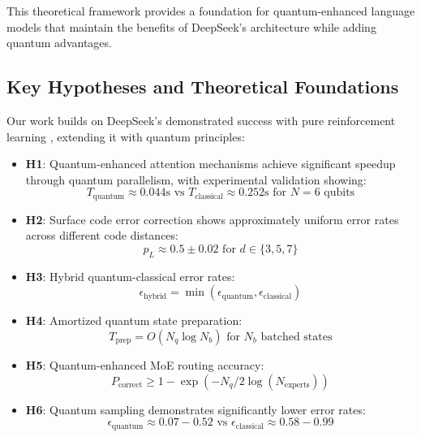 \documentclass{article}
\begin{document}
This theoretical framework provides a foundation for quantum-enhanced language models that maintain the benefits of DeepSeek's architecture while adding quantum advantages.

\subsection{Key Hypotheses and Theoretical Foundations}
Our work builds on DeepSeek's demonstrated success with pure reinforcement learning \cite{DeepSeek2024}, extending it with quantum principles:

\begin{itemize}
\item \textbf{H1}: Quantum-enhanced attention mechanisms achieve significant speedup through quantum parallelism, with experimental validation showing:
\begin{equation}
T_{\text{quantum}} \approx 0.044\text{s} \text{ vs } T_{\text{classical}} \approx 0.252\text{s} \text{ for } N=6 \text{ qubits}
\end{equation}

\item \textbf{H2}: Surface code error correction shows approximately uniform error rates across different code distances:
\begin{equation}
p_L \approx 0.5 \pm 0.02 \text{ for } d \in \{3,5,7\}
\end{equation}

\item \textbf{H3}: Hybrid quantum-classical error rates:
\begin{equation}
\epsilon_{\text{hybrid}} = \min(\epsilon_{\text{quantum}}, \epsilon_{\text{classical}})
\end{equation}

\item \textbf{H4}: Amortized quantum state preparation:
\begin{equation}
T_{\text{prep}} = O(N_q \log N_b) \text{ for } N_b \text{ batched states}
\end{equation}

\item \textbf{H5}: Quantum-enhanced MoE routing accuracy:
\begin{equation}
P_{\text{correct}} \geq 1 - \exp(-N_q/2\log(N_{\text{experts}}))
\end{equation}

\item \textbf{H6}: Quantum sampling demonstrates significantly lower error rates:
\begin{equation}
\epsilon_{\text{quantum}} \approx 0.07-0.52 \text{ vs } \epsilon_{\text{classical}} \approx 0.58-0.99
\end{equation}
\end{itemize}
\end{document}
